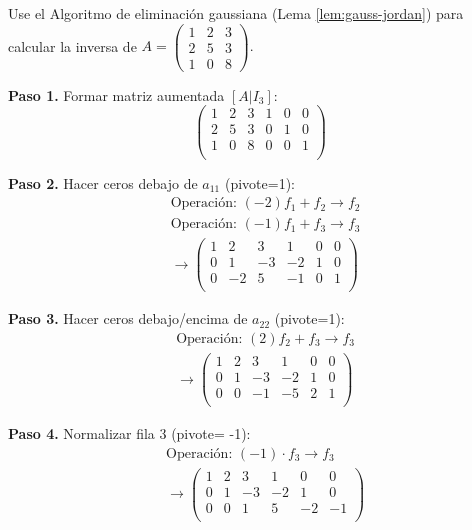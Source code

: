 \begin{example}\label{ej.inversa}
Use el Algoritmo de eliminación gaussiana (Lema \ref{lem:gauss-jordan}) para calcular la inversa de $A=\begin{pmatrix}1&2&3\\2&5&3\\1&0&8 \end{pmatrix}.$

\begin{myproof}
\textbf{Paso 1.} Formar matriz aumentada \([A|I_3]\):
\[
\left(\begin{array}{ccc|ccc}
1 & 2 & 3 & 1 & 0 & 0 \\
2 & 5 & 3 & 0 & 1 & 0 \\
1 & 0 & 8 & 0 & 0 & 1 \\
\end{array}\right)
\]

\textbf{Paso 2.} Hacer ceros debajo de \(a_{11}\) (pivote=1):
\begin{align*}
& \text{Operación: } (-2)f_1 + f_2 \to f_2 \\
& \text{Operación: } (-1)f_1 + f_3 \to f_3 \\
& \rightarrow \left(\begin{array}{ccc|ccc}
\boxed{1} & 2 & 3 & 1 & 0 & 0 \\
0 & 1 & -3 & -2 & 1 & 0 \\
0 & -2 & 5 & -1 & 0 & 1 \\
\end{array}\right)
\end{align*}

\textbf{Paso 3.} Hacer ceros debajo/encima de \(a_{22}\) (pivote=1):
\begin{align*}
& \text{Operación: } (2)f_2 + f_3 \to f_3 \\
& \rightarrow \left(\begin{array}{ccc|ccc}
1 & 2 & 3 & 1 & 0 & 0 \\
0 & \boxed{1} & -3 & -2 & 1 & 0 \\
0 & 0 & -1 & -5 & 2 & 1 \\
\end{array}\right)
\end{align*}

\textbf{Paso 4.} Normalizar fila 3 (pivote= -1):
\begin{align*}
& \text{Operación: } (-1) \cdot f_3 \to f_3 \\
& \rightarrow \left(\begin{array}{ccc|ccc}
1 & 2 & 3 & 1 & 0 & 0 \\
0 & 1 & -3 & -2 & 1 & 0 \\
0 & 0 & \boxed{1} & 5 & -2 & -1 \\
\end{array}\right)
\end{align*}


\end{myproof}
\end{example}
